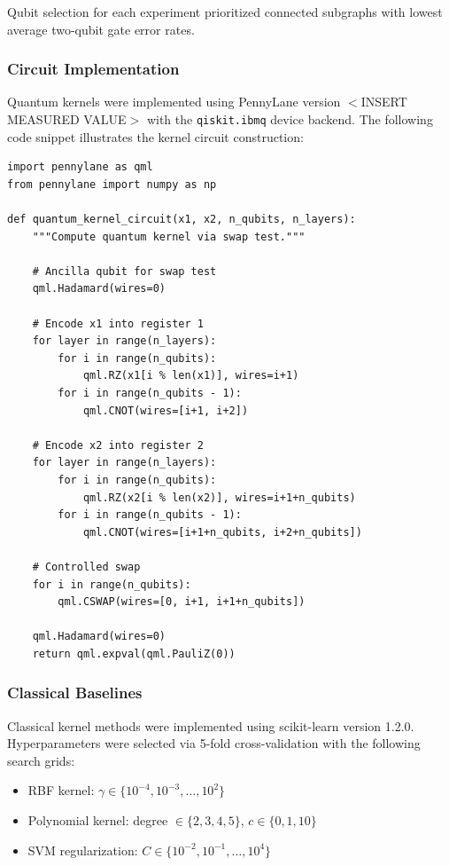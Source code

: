 \documentclass[aps,prb,reprint,superscriptaddress,showpacs]{revtex4-2}
\begin{document}
Qubit selection for each experiment prioritized connected subgraphs with lowest average two-qubit gate error rates.

\subsubsection{Circuit Implementation}

Quantum kernels were implemented using PennyLane version $<$INSERT MEASURED VALUE$>$ with the \texttt{qiskit.ibmq} device backend. The following code snippet illustrates the kernel circuit construction:

\begin{verbatim}
import pennylane as qml
from pennylane import numpy as np

def quantum_kernel_circuit(x1, x2, n_qubits, n_layers):
    """Compute quantum kernel via swap test."""
    
    # Ancilla qubit for swap test
    qml.Hadamard(wires=0)
    
    # Encode x1 into register 1
    for layer in range(n_layers):
        for i in range(n_qubits):
            qml.RZ(x1[i % len(x1)], wires=i+1)
        for i in range(n_qubits - 1):
            qml.CNOT(wires=[i+1, i+2])
    
    # Encode x2 into register 2  
    for layer in range(n_layers):
        for i in range(n_qubits):
            qml.RZ(x2[i % len(x2)], wires=i+1+n_qubits)
        for i in range(n_qubits - 1):
            qml.CNOT(wires=[i+1+n_qubits, i+2+n_qubits])
    
    # Controlled swap
    for i in range(n_qubits):
        qml.CSWAP(wires=[0, i+1, i+1+n_qubits])
    
    qml.Hadamard(wires=0)
    return qml.expval(qml.PauliZ(0))
\end{verbatim}

\subsubsection{Classical Baselines}

Classical kernel methods were implemented using scikit-learn version 1.2.0. Hyperparameters were selected via 5-fold cross-validation with the following search grids:
\begin{itemize}
    \item RBF kernel: $\gamma \in \{10^{-4}, 10^{-3}, \ldots, 10^{2}\}$
    \item Polynomial kernel: degree $\in \{2, 3, 4, 5\}$, $c \in \{0, 1, 10\}$
    \item SVM regularization: $C \in \{10^{-2}, 10^{-1}, \ldots, 10^{4}\}$
\end{itemize}
\end{document}
